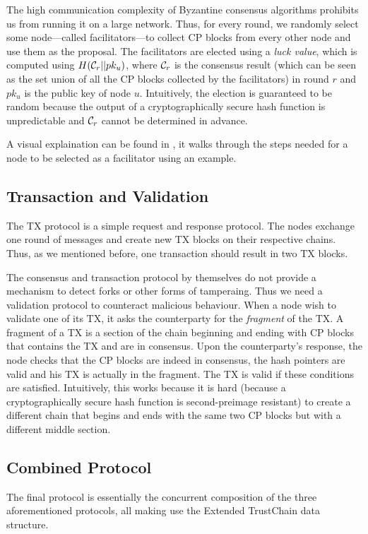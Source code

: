 The high communication complexity of Byzantine consensus algorithms prohibits us from running it on a large network.
Thus, for every round, we randomly select some node---called facilitators---to collect CP blocks from every other node and use them as the proposal.
The facilitators are elected using a \emph{luck value}, which is computed using $H(\mathcal{C}_r || pk_u)$,
where $\mathcal{C}_r$ is the consensus result 
(which can be seen as the set union of all the CP blocks collected by the facilitators)
in round $r$ and $pk_u$ is the public key of node $u$.
Intuitively, the election is guaranteed to be random 
because the output of a cryptographically secure hash function is unpredictable and $\mathcal{C}_r$ cannot be determined in advance.

A visual explaination can be found in ,
it walks through the steps needed for a node to be selected as a facilitator using an example.

\subsection{Transaction and Validation}
The TX protocol is a simple request and response protocol.
The nodes exchange one round of messages and create new TX blocks on their respective chains.
Thus, as we mentioned before, one transaction should result in two TX blocks.

The consensus and transaction protocol by themselves do not provide a mechanism to detect forks or other forms of tamperaing.
Thus we need a validation protocol to counteract malicious behaviour.
When a node wish to validate one of its TX, it asks the counterparty for the \emph{fragment} of the TX.
A fragment of a TX is a section of the chain beginning and ending with CP blocks that contains the TX and are in consensus.
Upon the counterparty's response, the node checks that the CP blocks are indeed in consensus,
the hash pointers are valid and his TX is actually in the fragment.
The TX is valid if these conditions are satisfied.
Intuitively, this works because it is hard (because a cryptographically secure hash function is second-preimage resistant)
to create a different chain that begins and ends with the same two CP blocks but with a different middle section.


\subsection{Combined Protocol}
\label{sec:combined-protocol}
The final protocol is essentially the concurrent composition of the three aforementioned protocols,
all making use the Extended TrustChain data structure.

